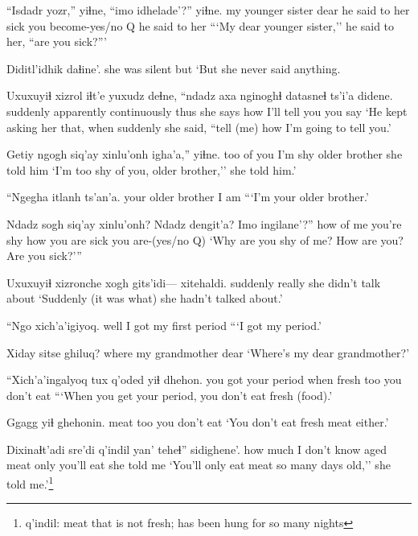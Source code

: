 \documentclass[12pt]{article}
\begin{document}
\gll ``Isdadr    yozr,'' yiɬne, ``imo  idhelade'?''      yiɬne.
{my younger sister} dear {he said to her} sick {you become-yes/no Q} {he said to her}
\glt ```My dear younger sister,'' he said to her, ``are you sick?'''
\glend

\gll Diditl'idhik daɬine'.
{{she was silent}} but
\glt `But she never said anything.
\glend

\gll Uxuxuyiɬ xizrol iɬt'e        yuxudz deɬne, {``ndadz axa}           {nginoghɬ datasneɬ} ts'i'a didene.
suddenly apparently    continuously        thus {she says} how   {I'll tell you}       {}  {you say}
\glt `He kept asking her that, when suddenly she said, ``tell (me) how I'm going to tell you.'
\glend

\gll Getiy ngogh {siq'ay xinlu'onh} igha'a,''        yiɬne.
too   {of you} {I'm shy}        {older brother} {she told him}
\glt `I'm too shy of you, older brother,'' she told him.'
\glend

\gll ``Ngegha             itlanh ts'an'a. 
{your older brother} {I am } 
\glt ```I'm your older brother.'
\glend

\gll Ndadz sogh {siq'ay xinlu'onh?} Ndadz dengit'a? Imo  ingilane'?''
how   {of me} {you're shy}  how   {you are}  sick {you are-(yes/no Q)}
\glt `Why are you shy of me? How are you? Are you sick?'''
\glend

\gll Uxuxuyiɬ xizronche {xogh gits'idi--- xitehaldi.            }
suddenly really    {she didn't talk about}
\glt `Suddenly (it was what) she hadn't talked about.'
\glend

\gll ``Ngo  xich'a'igiyoq. 
well {I got my first period}
\glt ```I got my period.'
\glend

\gll Xiday sitse          ghiluq?
where {my grandmother} dear
\glt `Where's my dear grandmother?'
\glend

\gll ``Xich'a'ingalyoq           tux  q'oded yiɬ dhehon.       
{you got your period} when fresh  too {you don't eat} 
\glt ```When you get your period, you don't eat fresh (food).'
\glend

\gll Ggagg yiɬ ghehonin.
meat too {you don't eat}
\glt `You don't eat fresh meat either.'
\glend

\gll Dixinaɬt'adi sre'di  q'indil       yan' teheɬ''      sidighene'.
{how much}     {I don't know} {aged meat} only {you'll eat} {she told me}
\glt `You'll only eat meat so many days old,'' she told me.'\footnote{q'indil:  meat that is not fresh; has been hung for so many nights}
\glend
\end{document}

